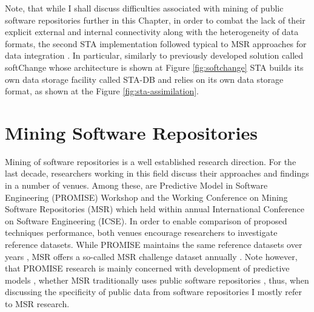Note, that while I shall discuss difficulties associated with mining of public software repositories further in this Chapter, 
in order to combat the lack of their explicit external and internal connectivity along with the heterogeneity of data formats,
the second STA implementation followed typical to MSR approaches for data integration \cite{citeulike:13058334} \cite{cvsanaly}. 
In particular, similarly to previously developed solution called softChange \cite{german04_softchange} whose 
architecture is shown at Figure \ref{fig:softchange} STA builds its own data storage facility called STA-DB and 
relies on its own data storage format, as shown at the Figure \ref{fig:sta-assimilation}.

\section{Mining Software Repositories}
Mining of software repositories is a well established research direction. For the last decade, researchers working in this 
field discuss their approaches and findings in a number of venues. Among these, are Predictive Model in Software Engineering 
(PROMISE) Workshop and the Working Conference on Mining Software Repositories (MSR) which held within annual International 
Conference on Software Engineering (ICSE).
In order to enable comparison of proposed techniques performance, both venues encourage researchers to investigate 
reference datasets. While PROMISE maintains the same reference datasets over years \cite{promise12}, MSR offers a so-called 
MSR challenge dataset annually \cite{MSRChallenge2013}.
Note however, that PROMISE research is mainly concerned with development of predictive models \cite{Menzies13},
whether MSR traditionally uses public software repositories 
\cite{citeulike:12550438} \cite{citeulike:2710928} \cite{citeulike:7853299}, thus, when discussing the 
specificity of public data from software repositories I mostly refer to MSR research.

